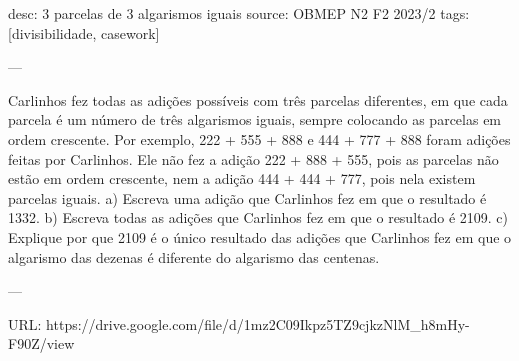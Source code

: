 desc:  $3$ parcelas de $3$ algarismos iguais
source:  OBMEP N2 F2 2023/2
tags:  [divisibilidade, casework]

---

Carlinhos fez todas as adições possíveis com três parcelas diferentes, em que cada parcela é um número de três algarismos iguais, sempre colocando as parcelas em ordem crescente. Por exemplo, 222 + 555 + 888 e 444 + 777 + 888 foram adições feitas por Carlinhos. Ele não fez a adição 222 + 888 + 555, pois as parcelas não estão em ordem crescente, nem a adição 444 + 444 + 777, pois nela existem parcelas iguais.
a) Escreva uma adição que Carlinhos fez em que o resultado é 1332.
b) Escreva todas as adições que Carlinhos fez em que o resultado é 2109.
c) Explique por que 2109 é o único resultado das adições que Carlinhos fez em que o algarismo das dezenas é diferente do algarismo das centenas.

---

URL: https://drive.google.com/file/d/1mz2C09Ikpz5TZ9cjkzNlM_h8mHy-F90Z/view
